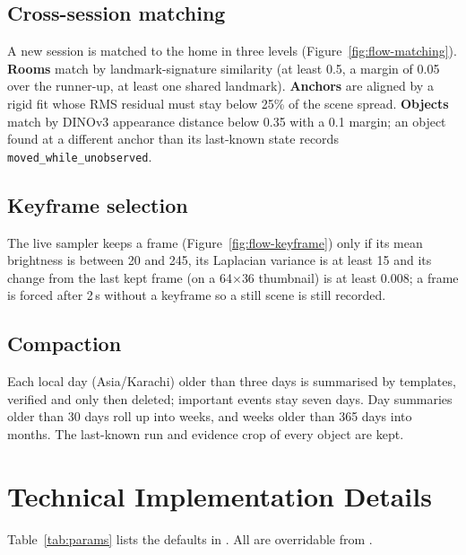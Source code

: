 \subsection{Cross-session matching}
\label{sec:matching-algo}
A new session is matched to the home in three levels
(Figure~\ref{fig:flow-matching}). \textbf{Rooms} match by landmark-signature
similarity (at least 0.5, a margin of 0.05 over the runner-up, at least one shared
landmark). \textbf{Anchors} are aligned by a rigid fit whose RMS residual must
stay below 25\% of the scene spread. \textbf{Objects} match by DINOv3 appearance
distance below 0.35 with a 0.1 margin; an object found at a different anchor
than its last-known state records \texttt{moved\_while\_unobserved}.


\subsection{Keyframe selection}
The live sampler keeps a frame (Figure~\ref{fig:flow-keyframe}) only if its mean
brightness is between 20 and 245, its Laplacian variance is at least 15 and its
change from the last kept frame (on a 64$\times$36 thumbnail) is at least 0.008;
a frame is forced after 2\,s without a keyframe so a still scene is still
recorded.


\subsection{Compaction}
Each local day (Asia/Karachi) older than three days is summarised by templates,
verified and only then deleted; important events stay seven days. Day summaries
older than 30 days roll up into weeks, and weeks older than 365 days into months.
The last-known run and evidence crop of every object are kept.

\section{Technical Implementation Details}
Table~\ref{tab:params} lists the defaults in . All are
overridable from .

